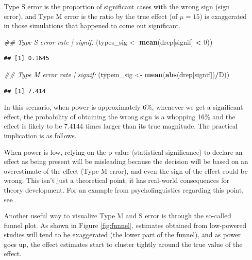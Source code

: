 \documentclass[12pt,]{krantz}
\newenvironment{Shaded}{\begin{snugshade}}{\end{snugshade}}
\newcommand{\CommentTok}[1]{\textcolor[rgb]{0.56,0.35,0.01}{\textit{#1}}}
\newcommand{\DecValTok}[1]{\textcolor[rgb]{0.00,0.00,0.81}{#1}}
\newcommand{\KeywordTok}[1]{\textcolor[rgb]{0.13,0.29,0.53}{\textbf{#1}}}
\newcommand{\NormalTok}[1]{#1}
\newcommand{\OperatorTok}[1]{\textcolor[rgb]{0.81,0.36,0.00}{\textbf{#1}}}
\newcommand{\StringTok}[1]{\textcolor[rgb]{0.31,0.60,0.02}{#1}}
\begin{document}
Type S error is the proportion of significant cases with the wrong sign (sign error), and Type M error is the ratio by the true effect (of \(\mu=15\)) is exaggerated in those simulations that happened to come out significant.

\begin{Shaded}
\begin{Highlighting}[]
\CommentTok{## Type S error rate | signif:}
\NormalTok{(types_sig <-}\StringTok{ }\KeywordTok{mean}\NormalTok{(drep[signif] }\OperatorTok{<}\StringTok{ }\DecValTok{0}\NormalTok{))}
\end{Highlighting}
\end{Shaded}

\begin{verbatim}
## [1] 0.1645
\end{verbatim}

\begin{Shaded}
\begin{Highlighting}[]
\CommentTok{## Type M error rate | signif:}
\NormalTok{(typem_sig <-}\StringTok{ }\KeywordTok{mean}\NormalTok{(}\KeywordTok{abs}\NormalTok{(drep[signif])}\OperatorTok{/}\NormalTok{D))}
\end{Highlighting}
\end{Shaded}

\begin{verbatim}
## [1] 7.414
\end{verbatim}

In this scenario, when power is approximately 6\%, whenever we get a significant effect, the probability of obtaining the wrong sign is a whopping 16\% and the effect is likely to be 7.4144 times larger than its true magnitude. The practical implication is as follows.

When power is low, relying on the p-value (statistical significance) to declare an effect as being present will be misleading because the decision will be based on an overestimate of the effect (Type M error), and even the sign of the effect could be wrong. This isn't just a theoretical point; it has real-world consequences for theory development. For an example from psycholinguistics regarding this point, see \citet{VasishthMertzenJaegerGelman2018}.

Another useful way to visualize Type M and S error is through the so-called funnel plot. As shown in Figure \ref{fig:funnel}, estimates obtained from low-powered studies will tend to be exaggerated (the lower part of the funnel), and as power goes up, the effect estimates start to cluster tightly around the true value of the effect.
\end{document}
